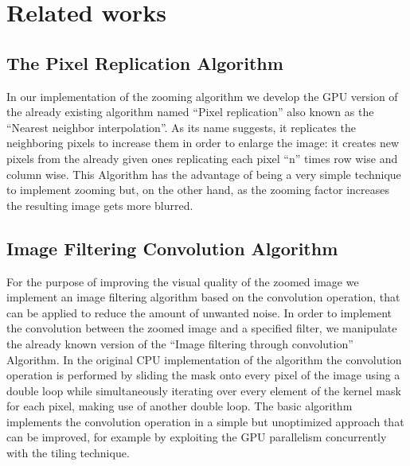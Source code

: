 \section{Related works}

    \subsection{The Pixel Replication Algorithm}
    In our implementation of the zooming algorithm we develop the GPU version of the already existing algorithm named “Pixel replication” also known as the “Nearest neighbor interpolation”.
    As its name suggests, it replicates the neighboring pixels to increase them in order to enlarge the image: it creates new pixels from the already given ones replicating each pixel “n” times row wise and column wise.
    This Algorithm has the advantage of being a very simple technique to implement zooming but, on the other hand, as the zooming factor increases the resulting image gets more blurred.


    \subsection{Image Filtering Convolution Algorithm}
    For the purpose of improving the visual quality of the zoomed image we implement an image filtering algorithm based on the convolution operation, that can be applied to reduce the amount of unwanted noise. 
    In order to implement the convolution between the zoomed image and a specified filter, we manipulate the already known version of the “Image filtering through convolution” Algorithm.
    In the original CPU implementation of the algorithm the convolution operation is performed by sliding the mask onto every pixel of the image using a double loop while simultaneously iterating over every element of the kernel mask for each pixel, making use of another double loop.
    The basic algorithm implements the convolution operation in a simple but unoptimized approach that can be improved, for example by exploiting the GPU parallelism concurrently with the tiling technique. 
